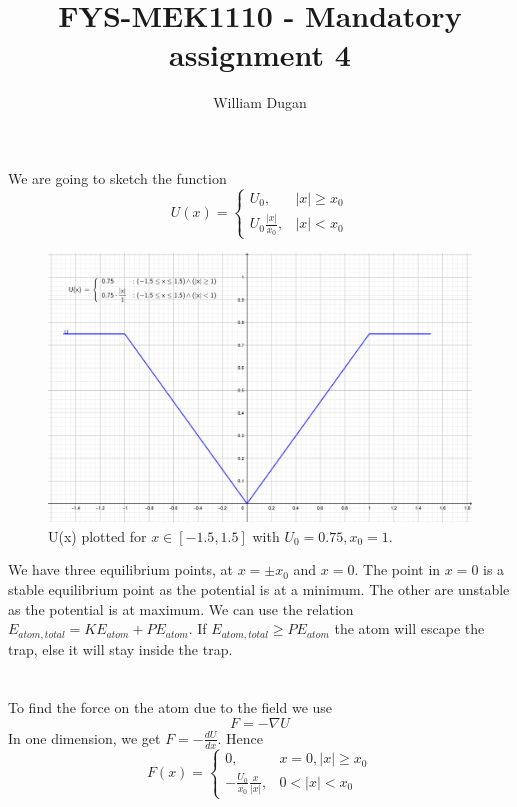 \documentclass[a4paper,10pt,english]{article}
\title{FYS-MEK1110 - Mandatory assignment 4}
\author{William Dugan}
\begin{document}
\maketitle

\section{}
We are going to sketch the function
\begin{equation}
U(x) = 
    \left\{\begin{matrix}
    U_0, & |x| \geq x_0 \\ 
    U_0 \frac{|x|}{x_0}, & |x| < x_0
    \end{matrix}\right.
\end{equation}

\begin{figure}[h!]
    \centering
    \includegraphics[scale=0.4]{figure_a.png}
    \caption{U(x) plotted for $x\in[-1.5, 1.5]$ with $U_0 = 0.75, x_0 = 1$.}
    \label{fig:fig_a}
\end{figure}

We have three equilibrium points, at $x=\pm x_0$ and $x=0$. The point in $x=0$ is a stable equilibrium point as the potential is at a minimum. The other are unstable as the potential is at maximum. We can use the relation $E_{atom, total} = KE_{atom} + PE_{atom}$. If $E_{atom, total} \geq PE_{atom}$ the atom will escape the trap, else it will stay inside the trap. 

\section{}
To find the force on the atom due to the field we use 
\begin{equation}
    F = - \nabla U
\end{equation}
In one dimension, we get $F = - \frac{dU}{dx}$. Hence
\begin{equation}
F(x) = 
    \left\{\begin{matrix}
    0, & x=0, |x| \geq x_0 \\ 
    -\frac{U_0}{x_0} \frac{x}{|x|}, & 0 < |x| < x_0
    \end{matrix}\right.
\end{equation}
\end{document}
